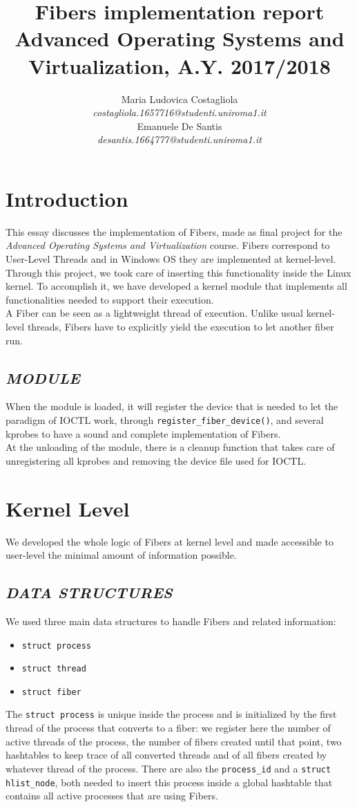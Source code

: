 \documentclass[a4paper]{article}
\author{\large Maria Ludovica Costagliola \\
        \small \textit{costagliola.1657716@studenti.uniroma1.it} \medskip\\
        \large Emanuele De Santis \\
        \small \textit{desantis.1664777@studenti.uniroma1.it}}
\title{Fibers implementation report\\
        \smallskip
        \small Advanced Operating Systems and Virtualization, A.Y. 2017/2018}
\date{}
\begin{document}
\maketitle
\section{Introduction}
This essay discusses the implementation of Fibers, made as final project for the \textit{Advanced Operating Systems and Virtualization} course. Fibers correspond to User-Level Threads and in Windows OS they are implemented at kernel-level. Through this project, we took care of inserting this functionality inside the Linux kernel. To accomplish it, we have developed a kernel module that implements all functionalities needed to support their execution.\bigskip\\
A Fiber can be seen as a lightweight thread of execution. Unlike usual kernel-level threads, Fibers have to explicitly yield the execution to let another fiber run.

\subsection*{\textit{MODULE}}
When the module is loaded, it will register the device that is needed to let the paradigm of IOCTL work, through \texttt{register\_fiber\_device()}, and several kprobes to have a sound and complete implementation of Fibers.\bigskip\\
At the unloading of the module, there is a cleanup function that takes care of unregistering all kprobes and removing the device file used for IOCTL.

\section{Kernel Level}
We developed the whole logic of Fibers at kernel level and made accessible to user-level the minimal amount of information possible.

\subsection*{\textit{DATA STRUCTURES}}
We used three main data structures to handle Fibers and related information:
\begin{itemize}
  \item \texttt{struct process}
  \item \texttt{struct thread}
  \item \texttt{struct fiber}
\end{itemize}
The \texttt{struct process} is unique inside the process and is initialized by the first thread of the process that converts to a fiber: we register here the number of active threads of the process, the number of fibers created until that point, two hashtables to keep trace of all converted threads and of all fibers created by whatever thread of the process. There are also the \texttt{process\_id} and a \texttt{struct hlist\_node}, both needed to insert this process inside a global hashtable that contains all active processes that are using Fibers.\bigskip\\
\end{document}
